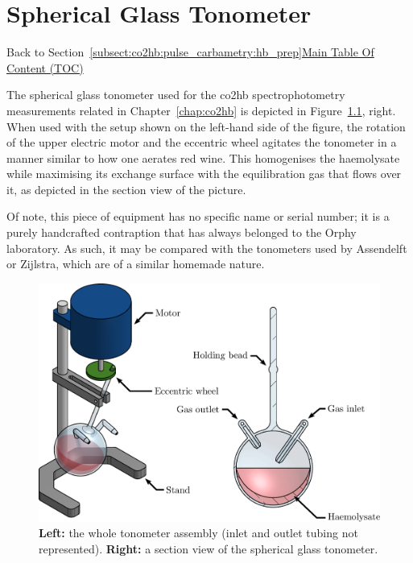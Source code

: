 \chapter{Spherical Glass Tonometer}\label{app:tonometer}

\begin{appbox}
	Back to Section~\ref{subsect:co2hb:pulse_carbametry:hb_prep}\hfill \hyperref[chapter:toc]{Main Table Of Content (TOC)}
\end{appbox}

The spherical glass tonometer used for the \gls{co2hb} spectrophotometry measurements related in Chapter~\ref{chap:co2hb} is depicted in Figure~\ref{annfig:tonometer:tonometer}, right. When used with the setup shown on the left-hand side of the figure, the rotation of the upper electric motor and the eccentric wheel agitates the tonometer in a manner similar to how one aerates red wine. This homogenises the haemolysate while maximising its exchange surface with the equilibration gas that flows over it, as depicted in the section view of the picture.

Of note, this piece of equipment has no specific name or serial number; it is a purely handcrafted contraption that has always belonged to the Orphy laboratory. As such, it may be compared with the tonometers used by Assendelft or Zijlstra, which are of a similar homemade nature\cite[Fig.~3.1]{assendelft1970}\cite[Fig.~6.1]{zijlstra2000}.

\begin{figure}
	\centering
	\includegraphics[width=\textwidth]{2_appendices/figures/tonometer.pdf}
	\caption[3D views of the spherical glass tonometer.]{\textbf{Left:} the whole tonometer assembly (inlet and outlet tubing not represented). \textbf{Right:} a section view of the spherical glass tonometer.}
	\label{annfig:tonometer:tonometer}
\end{figure}
